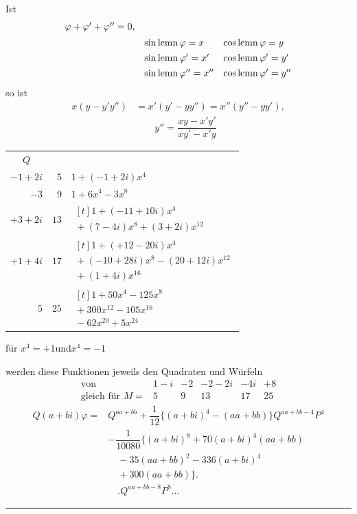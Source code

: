 Ist
\[
\begin{array}{rll}
\varphi+\varphi'+\varphi''=0,\\[5pt]&\operatorname{sin\,lemn}\varphi=x&\operatorname{cos\,lemn}\varphi=y\\[4pt]
&\operatorname{sin\,lemn}\varphi'=x'&\operatorname{cos\,lemn}\varphi'=y'\\[4pt]
&\operatorname{sin\,lemn}\varphi''=x''&\operatorname{cos\,lemn}\varphi'=y''
\end{array}
\]
so ist
\[
\begin{aligned}x(y-y'y'')&=x'(y'-yy'')=x''(y''-yy'),\\[7pt]&\qquad
y''=\dfrac{xy-x'y'}{xy'-x'y}\end{aligned}
\]
\begin{center}
\small
\begin{tabular}{r|r|l}
\multicolumn{1}{c}{$Q$}&\multicolumn{1}{c}{}&\multicolumn{1}{c}{}\\
$-1+2i$&$5$&$1+(-1+2i)x^4$\\[9pt]
$-3$&$9$&$1+6x^4-3x^8$\\[9pt]
$+3+2i$&$13$&$\begin{aligned}[t]1+(-11+10i)x^4\\[3pt]{}+(7-4i)x^8+(3+2i)x^{12}\end{aligned}$\\[9pt]
$+1+4i$&$17$&$\begin{aligned}[t]1+(+12-20i)x^4\\[3pt]{}+(-10+28i)x^8-(20+12i)x^{12}\\[3pt]{}+(1+4i)x^{16}\end{aligned}$\\[9pt]
$5$&$25$&$\begin{aligned}[t]1+50x^4-125x^8\\[3pt]{}+300x^{12}-105x^{16}\\[3pt]{}-62x^{20}+5x^{24}\end{aligned}$
\end{tabular}
\end{center}

für \hfill $x^4=+1$\quad und\quad $x^4=-1$\hfill\mbox{}

werden diese Funktionen jeweils den Quadraten und Würfeln
\[
\begin{array}{rccccc}
\text{von}&1-i&-2&-2-2i&-4i&+8\\
\text{gleich für }M=&5&9&13&17&25
\end{array}
\]
\[
\begin{aligned}
Q(a+bi)\varphi={}&Q^{aa+bb}+\dfrac1{12}\{(a+bi)^4-(aa+bb)\}Q^{aa+bb-4}P^4\\[7pt]
&-\dfrac1{10080}\{(a+bi)^8+70(a+bi)^4(aa+bb)\\[5pt]&\quad{}-35(aa+bb)^2-336(a+bi)^4\\[5pt]&\quad{}+300(aa+bb)\}.\\[7pt]
&\quad.Q^{aa+bb-8}P^8\mathord{.}\mathord{.}\mathord{.}
\end{aligned}
\]
\par\begin{center}\rule{.22\linewidth}{.3pt}\end{center}
\clearpage
\endgroup
